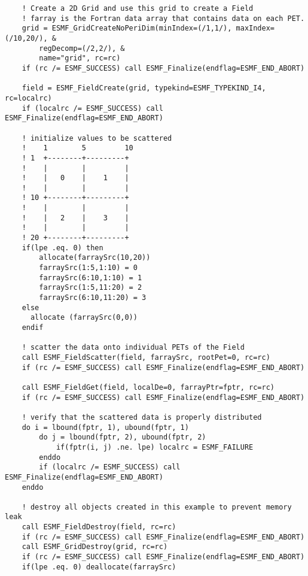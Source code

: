  \begin{verbatim}
    ! Create a 2D Grid and use this grid to create a Field
    ! farray is the Fortran data array that contains data on each PET.
    grid = ESMF_GridCreateNoPeriDim(minIndex=(/1,1/), maxIndex=(/10,20/), &
        regDecomp=(/2,2/), &
        name="grid", rc=rc)
    if (rc /= ESMF_SUCCESS) call ESMF_Finalize(endflag=ESMF_END_ABORT)

    field = ESMF_FieldCreate(grid, typekind=ESMF_TYPEKIND_I4, rc=localrc)
    if (localrc /= ESMF_SUCCESS) call ESMF_Finalize(endflag=ESMF_END_ABORT)

    ! initialize values to be scattered
    !    1        5         10
    ! 1  +--------+---------+
    !    |        |         |
    !    |   0    |    1    |
    !    |        |         |
    ! 10 +--------+---------+
    !    |        |         |
    !    |   2    |    3    |
    !    |        |         |
    ! 20 +--------+---------+
    if(lpe .eq. 0) then
        allocate(farraySrc(10,20))
        farraySrc(1:5,1:10) = 0
        farraySrc(6:10,1:10) = 1
        farraySrc(1:5,11:20) = 2
        farraySrc(6:10,11:20) = 3
    else
      allocate (farraySrc(0,0))
    endif

    ! scatter the data onto individual PETs of the Field
    call ESMF_FieldScatter(field, farraySrc, rootPet=0, rc=rc)
    if (rc /= ESMF_SUCCESS) call ESMF_Finalize(endflag=ESMF_END_ABORT)

    call ESMF_FieldGet(field, localDe=0, farrayPtr=fptr, rc=rc)
    if (rc /= ESMF_SUCCESS) call ESMF_Finalize(endflag=ESMF_END_ABORT)

    ! verify that the scattered data is properly distributed
    do i = lbound(fptr, 1), ubound(fptr, 1)
        do j = lbound(fptr, 2), ubound(fptr, 2)
            if(fptr(i, j) .ne. lpe) localrc = ESMF_FAILURE
        enddo
        if (localrc /= ESMF_SUCCESS) call ESMF_Finalize(endflag=ESMF_END_ABORT)
    enddo

    ! destroy all objects created in this example to prevent memory leak
    call ESMF_FieldDestroy(field, rc=rc)
    if (rc /= ESMF_SUCCESS) call ESMF_Finalize(endflag=ESMF_END_ABORT)
    call ESMF_GridDestroy(grid, rc=rc)
    if (rc /= ESMF_SUCCESS) call ESMF_Finalize(endflag=ESMF_END_ABORT)
    if(lpe .eq. 0) deallocate(farraySrc)
 
\end{verbatim}

\setlength{\parskip}{\oldparskip}
\setlength{\parindent}{\oldparindent}
\setlength{\baselineskip}{\oldbaselineskip}
